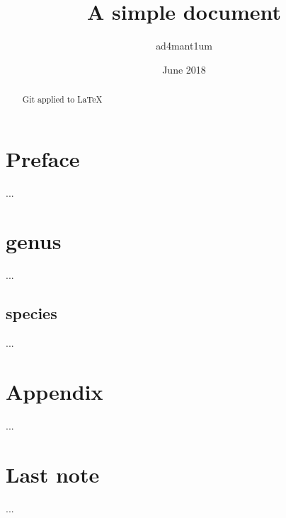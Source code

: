 \documentclass{book}
\begin{document}
\frontmatter
\title{A simple document}
\author{ad4mant1um}
\date{June 2018}
\maketitle

\begin{abstract}
  Git applied to \LaTeX
\end{abstract}

\tableofcontents
\chapter{Preface}
...

\mainmatter
\chapter{genus}
...
\section{species}
...

\appendix
\chapter{Appendix}
...

\backmatter
\chapter{Last note}
...
\end{document}
